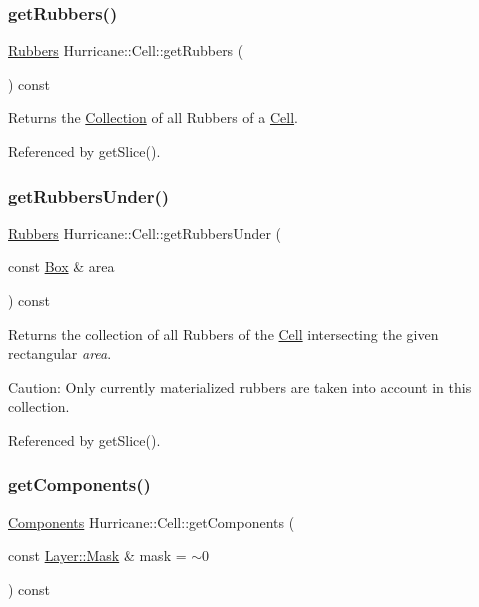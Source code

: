 \subsubsection{\texorpdfstring{get\+Rubbers()}{getRubbers()}}
{\footnotesize\ttfamily \hyperlink{namespaceHurricane_af8923abd57508cc44931a00d61b564ad}{Rubbers} Hurricane\+::\+Cell\+::get\+Rubbers (\begin{DoxyParamCaption}{ }\end{DoxyParamCaption}) const}

Returns the \hyperlink{classHurricane_1_1Collection}{Collection} of all Rubbers of a \hyperlink{classHurricane_1_1Cell}{Cell}. 

Referenced by get\+Slice().

\mbox{\label{classHurricane_1_1Cell_a58c6e24401d15f375547ad95b5c2c27c}} 
\subsubsection{\texorpdfstring{get\+Rubbers\+Under()}{getRubbersUnder()}}
{\footnotesize\ttfamily \hyperlink{namespaceHurricane_af8923abd57508cc44931a00d61b564ad}{Rubbers} Hurricane\+::\+Cell\+::get\+Rubbers\+Under (\begin{DoxyParamCaption}\item[{const \hyperlink{classHurricane_1_1Box}{Box} \&}]{area }\end{DoxyParamCaption}) const}

Returns the collection of all Rubbers of the \hyperlink{classHurricane_1_1Cell}{Cell} intersecting the given rectangular {\itshape area}.

\begin{DoxyParagraph}{Caution\+:}
Only currently materialized rubbers are taken into account in this collection. 
\end{DoxyParagraph}


Referenced by get\+Slice().

\mbox{\label{classHurricane_1_1Cell_a14cb1b1f27e75d4af5b34a9a5956d818}} 
\subsubsection{\texorpdfstring{get\+Components()}{getComponents()}}
{\footnotesize\ttfamily \hyperlink{namespaceHurricane_a7d26d99aeb5dd6d70d51bd35d2473e72}{Components} Hurricane\+::\+Cell\+::get\+Components (\begin{DoxyParamCaption}\item[{const \hyperlink{classHurricane_1_1Layer_af5277c670637bd5d910237e7afe01a91}{Layer\+::\+Mask} \&}]{mask = {\ttfamily $\sim$0} }\end{DoxyParamCaption}) const}

